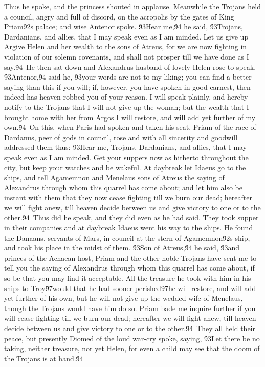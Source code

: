 {Thus he spoke, and the princess shouted in applause. Meanwhile the Trojans held a council, angry and full of discord, on the acropolis by the gates of King Priam\'92s palace; and wise Antenor spoke. \'93Hear me,\'94 he said, \'93Trojans, Dardanians, and allies, that I may speak even as I am minded. Let us give up Argive Helen and her wealth to the sons of Atreus, for we are now fighting in violation of our solemn covenants, and shall not prosper till we have done as I say.\'94\
He then sat down and Alexandrus husband of lovely Helen rose to speak. \'93Antenor,\'94 said he, \'93your words are not to my liking; you can find a better saying than this if you will; if, however, you have spoken in good earnest, then indeed has heaven robbed you of your reason. I will speak plainly, and hereby notify to the Trojans that I will not give up the woman; but the wealth that I brought home with her from Argos I will restore, and will add yet further of my own.\'94\
On this, when Paris had spoken and taken his seat, Priam of the race of Dardanus, peer of gods in council, rose and with all sincerity and goodwill addressed them thus: \'93Hear me, Trojans, Dardanians, and allies, that I may speak even as I am minded. Get your suppers now as hitherto throughout the city, but keep your watches and be wakeful. At daybreak let Idaeus go to the ships, and tell Agamemnon and Menelaus sons of Atreus the saying of Alexandrus through whom this quarrel has come about; and let him also be instant with them that they now cease fighting till we burn our dead; hereafter we will fight anew, till heaven decide between us and give victory to one or to the other.\'94\
Thus did he speak, and they did even as he had said. They took supper in their companies and at daybreak Idaeus went his way to the ships. He found the Danaans, servants of Mars, in council at the stern of Agamemnon\'92s ship, and took his place in the midst of them. \'93Son of Atreus,\'94 he said, \'93and princes of the Achaean host, Priam and the other noble Trojans have sent me to tell you the saying of Alexandrus through whom this quarrel has come about, if so be that you may find it acceptable. All the treasure he took with him in his ships to Troy\'97would that he had sooner perished\'97he will restore, and will add yet further of his own, but he will not give up the wedded wife of Menelaus, though the Trojans would have him do so. Priam bade me inquire further if you will cease fighting till we burn our dead; hereafter we will fight anew, till heaven decide between us and give victory to one or to the other.\'94\
They all held their peace, but presently Diomed of the loud war-cry spoke, saying, \'93Let there be no taking, neither treasure, nor yet Helen, for even a child may see that the doom of the Trojans is at hand.\'94\
}
